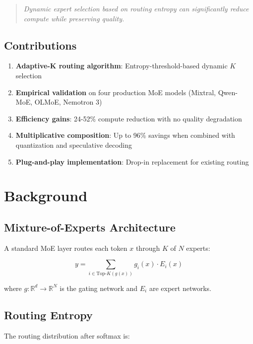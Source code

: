 \documentclass{article}
\begin{document}
\begin{quote}
\textit{Dynamic expert selection based on routing entropy can significantly reduce compute while preserving quality.}
\end{quote}

\subsection{Contributions}

\begin{enumerate}
    \item \textbf{Adaptive-K routing algorithm}: Entropy-threshold-based dynamic $K$ selection
    \item \textbf{Empirical validation} on four production MoE models (Mixtral, Qwen-MoE, OLMoE, Nemotron 3)
    \item \textbf{Efficiency gains}: 24-52\% compute reduction with no quality degradation
    \item \textbf{Multiplicative composition}: Up to 96\% savings when combined with quantization and speculative decoding
    \item \textbf{Plug-and-play implementation}: Drop-in replacement for existing routing
\end{enumerate}

\section{Background}

\subsection{Mixture-of-Experts Architecture}

A standard MoE layer routes each token $x$ through $K$ of $N$ experts:

\begin{equation}
y = \sum_{i \in \text{Top-}K(g(x))} g_i(x) \cdot E_i(x)
\end{equation}

where $g: \mathbb{R}^d \rightarrow \mathbb{R}^N$ is the gating network and $E_i$ are expert networks.

\subsection{Routing Entropy}

The routing distribution after softmax is:
\end{document}
